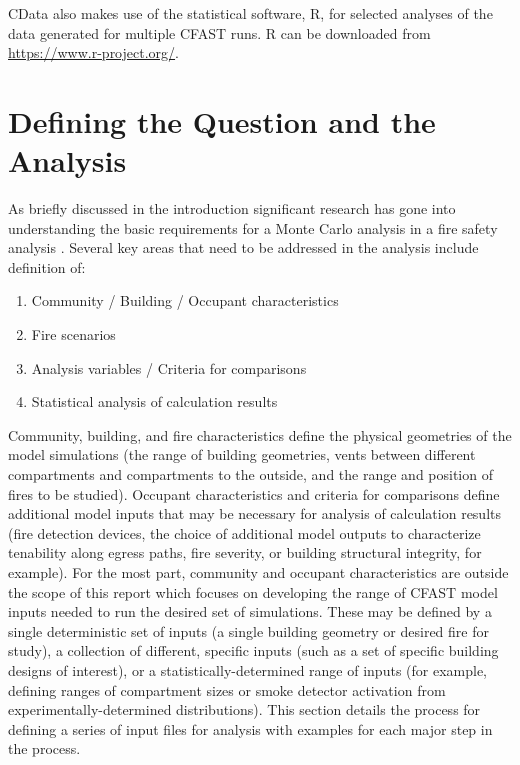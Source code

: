 \documentclass[12pt,twoside]{book}
\begin{document}
CData also makes use of the statistical software, R, for selected analyses of the data generated for multiple CFAST runs. R can be downloaded from \url{https://www.r-project.org/}.

%
%

\section{Defining the Question and the Analysis}

As briefly discussed in the introduction significant research has gone into understanding the basic requirements for a Monte Carlo analysis in a fire safety analysis \cite{Bukowski_1985,Clarke_1990,NFPA_5000,Hurley_2016,bruns_tn_2016}. Several key areas that need to be addressed in the analysis include definition of:

\begin{enumerate}
  \item Community / Building / Occupant characteristics
  \item Fire scenarios
  \item Analysis variables / Criteria for comparisons
  \item Statistical analysis of calculation results
\end{enumerate}

Community, building, and fire characteristics define the physical geometries of the model simulations (the range of building geometries, vents between different compartments and compartments to the outside, and the range and position of fires to be studied). Occupant characteristics and criteria for comparisons define additional model inputs that may be necessary for analysis of calculation results (fire detection devices, the choice of additional model outputs to characterize tenability along egress paths, fire severity, or building structural integrity, for example). For the most part, community and occupant characteristics are outside the scope of this report which focuses on developing the range of CFAST model inputs needed to run the desired set of simulations. These may be defined by a single deterministic set of inputs (a single building geometry or desired fire for study), a collection of different, specific inputs (such as a set of specific building designs of interest), or a statistically-determined range of inputs (for example, defining ranges of compartment sizes or smoke detector activation from experimentally-determined distributions). This section details the process for defining a series of input files for analysis with examples for each major step in the process.
\end{document}
